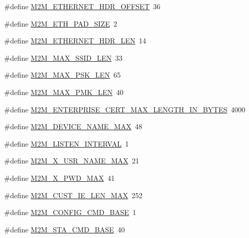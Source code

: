 \begin{DoxyCompactItemize}
\item 
\#define \hyperlink{group__WlanDefines_ga083f2ee97dbde0aea1372d3c0aa18de4}{M2\+M\+\_\+\+E\+T\+H\+E\+R\+N\+E\+T\+\_\+\+H\+D\+R\+\_\+\+O\+F\+F\+S\+ET}~36
\item 
\#define \hyperlink{group__WlanDefines_ga3496dd7fbc0c97936dda2e6f9b91fa16}{M2\+M\+\_\+\+E\+T\+H\+\_\+\+P\+A\+D\+\_\+\+S\+I\+ZE}~2
\item 
\#define \hyperlink{group__WlanDefines_ga2e92eed1cebe5e5973b1682baf87d0a3}{M2\+M\+\_\+\+E\+T\+H\+E\+R\+N\+E\+T\+\_\+\+H\+D\+R\+\_\+\+L\+EN}~14
\item 
\#define \hyperlink{group__WlanDefines_gab2bd95c18ede2fbc07b44c5660cc0097}{M2\+M\+\_\+\+M\+A\+X\+\_\+\+S\+S\+I\+D\+\_\+\+L\+EN}~33
\item 
\#define \hyperlink{group__WlanDefines_ga790a7e0471ff8a179238863dc2021f6d}{M2\+M\+\_\+\+M\+A\+X\+\_\+\+P\+S\+K\+\_\+\+L\+EN}~65
\item 
\#define \hyperlink{group__WlanDefines_ga160183536c79910c9743ac0acf863e5d}{M2\+M\+\_\+\+M\+A\+X\+\_\+\+P\+M\+K\+\_\+\+L\+EN}~40
\item 
\#define \hyperlink{group__WlanDefines_gabf69de3b7d31e367ce33de90e5ee941c}{M2\+M\+\_\+\+E\+N\+T\+E\+R\+P\+R\+I\+S\+E\+\_\+\+C\+E\+R\+T\+\_\+\+M\+A\+X\+\_\+\+L\+E\+N\+G\+T\+H\+\_\+\+I\+N\+\_\+\+B\+Y\+T\+ES}~4000
\item 
\#define \hyperlink{group__WlanDefines_ga13694b7fb6c7afefab58c38a43aa1957}{M2\+M\+\_\+\+D\+E\+V\+I\+C\+E\+\_\+\+N\+A\+M\+E\+\_\+\+M\+AX}~48
\item 
\#define \hyperlink{group__WlanDefines_gaeba577f0df70feddc9d2a3e6269ae859}{M2\+M\+\_\+\+L\+I\+S\+T\+E\+N\+\_\+\+I\+N\+T\+E\+R\+V\+AL}~1
\item 
\#define \hyperlink{group__WlanDefines_ga0a22970c1dd8d0cb58c5c1b35217618d}{M2\+M\+\_\+X\+\_\+\+U\+S\+R\+\_\+\+N\+A\+M\+E\+\_\+\+M\+AX}~21
\item 
\#define \hyperlink{group__WlanDefines_ga55139884349304f2d747ec28e157368b}{M2\+M\+\_\+X\+\_\+\+P\+W\+D\+\_\+\+M\+AX}~41
\item 
\#define \hyperlink{group__WlanDefines_gac03bb9e626f8472cad4f60ad3a0f9b84}{M2\+M\+\_\+\+C\+U\+S\+T\+\_\+\+I\+E\+\_\+\+L\+E\+N\+\_\+\+M\+AX}~252
\item 
\#define \hyperlink{group__WlanDefines_ga8cb2c74aa2cc33e2191ed3aa06ab5e9d}{M2\+M\+\_\+\+C\+O\+N\+F\+I\+G\+\_\+\+C\+M\+D\+\_\+\+B\+A\+SE}~1
\item 
\#define \hyperlink{group__WlanDefines_ga540bce34da625f3e2109c26409cbb127}{M2\+M\+\_\+\+S\+T\+A\+\_\+\+C\+M\+D\+\_\+\+B\+A\+SE}~40

\end{DoxyCompactItemize}

